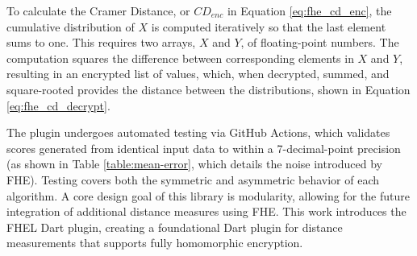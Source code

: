 



To calculate the Cramer Distance, or $CD_{enc}$ in Equation \ref{eq:fhe_cd_enc}, the cumulative distribution of $X$ is computed iteratively so that the last element sums to one. This requires two arrays, $X$ and $Y$, of floating-point numbers. The computation squares the difference between corresponding elements in $X$ and $Y$, resulting in an encrypted list of values, which, when decrypted, summed, and square-rooted provides the distance between the distributions, shown in Equation \ref{eq:fhe_cd_decrypt}.





The plugin undergoes automated testing via GitHub Actions, which validates scores generated from identical input data to within a 7-decimal-point precision (as shown in Table \ref{table:mean-error}, which details the noise introduced by FHE). Testing covers both the symmetric and asymmetric behavior of each algorithm. A core design goal of this library is modularity, allowing for the future integration of additional distance measures using FHE. This work introduces the FHEL Dart plugin, creating a foundational Dart plugin for distance measurements that supports fully homomorphic encryption.
